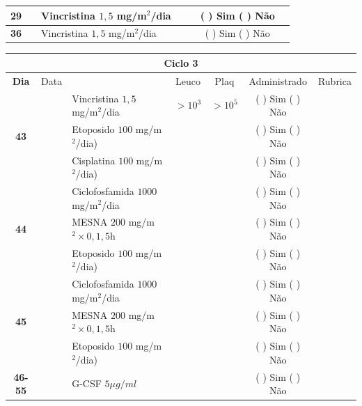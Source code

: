 \documentclass[11pt,a4paper,oldfontcommands]{memoir}
\begin{document}
\begin{center}
\begin{table}[H]
\begin{tabular}{p{1cm}c|p{4cm}|p{2cm}p{2cm}|c|c}
    \hline
    \multicolumn{1}{c|}{\textbf{29}}&&{Vincristina \(1,5\) mg/m\(^2\)/dia}&\multicolumn{1}{c}{}&&{(  ) Sim (  ) Não}&\\
    \hline
    \multicolumn{1}{c|}{\textbf{36}}&&{Vincristina \(1,5\) mg/m\(^2\)/dia}&\multicolumn{1}{c}{}&&{(  ) Sim (  ) Não}&\\
    \hline
\end{tabular}
\end{table}
\begin{table}[H] \small
\begin{tabular}{p{1cm}c|p{4.8cm}|p{1.5cm}p{1.5cm}|c|c}
	\hline
	\multicolumn{7}{c}{Ciclo 3} \\
	\hline
	\multicolumn{1}{c|}{\multirow{1}{*}{\textbf{Dia}}}&{Data}&{}&\multicolumn{1}{c|}{Leuco}&\multicolumn{1}{c|}{Plaq}&{Administrado}&{Rubrica} \\
    \hline
    \multicolumn{1}{c|}{\multirow{3}{*}{\textbf{43}}}&&{Vincristina \(1,5\) mg/m\(^2\)/dia}&\multicolumn{1}{c|}{\(>10^3\)}&\multicolumn{1}{c|}{\(>10^5\)}&{(  ) Sim (  ) Não}&\\
    \cline{4-5}
    \multicolumn{1}{c|}{}&&{Etoposido \(100\) mg/m\(^2\)/dia)}&&&{(  ) Sim (  ) Não}&\\
    \cline{4-5}
    \multicolumn{1}{c|}{}&\multirow{1}{*}{}&{Cisplatina \(100\) mg/m\(^2\)/dia)}&&&{(  ) Sim (  ) Não}&\\
    \hline
    \multicolumn{1}{c|}{\multirow{3}{*}{\textbf{44}}}&&{Ciclofosfamida \(1000\) mg/m\(^2\)/dia}&{}&&{(  ) Sim (  ) Não}&\\
    \multicolumn{1}{c|}{}&&{MESNA \(200\) mg/m\(^2 \times 0,1,5\)h}&&&{(  ) Sim (  ) Não}&\\
    \multicolumn{1}{c|}{}&&{Etoposido \(100\) mg/m\(^2\)/dia)}&&&{(  ) Sim (  ) Não}&\\
    \hline
    \multicolumn{1}{c|}{\multirow{3}{*}{\textbf{45}}}&&{Ciclofosfamida \(1000\) mg/m\(^2\)/dia}&{}&&{(  ) Sim (  ) Não}&\\
    \multicolumn{1}{c|}{}&&{MESNA \(200\) mg/m\(^2 \times 0,1,5\)h}&&&{(  ) Sim (  ) Não}&\\
    \multicolumn{1}{c|}{}&\multirow{1}{*}{}&{Etoposido \(100\) mg/m\(^2\)/dia)}&{}&&{(  ) Sim (  ) Não}&\\
    \hline
    \multicolumn{1}{c|}{\textbf{46-55}}&&{G-CSF \(5 \mu g/ml\) }&&&{(  ) Sim (  ) Não}&\\
    \hline
\end{tabular}
\end{table}
\begin{table}[H]

\end{table}
\end{center}
\end{document}
